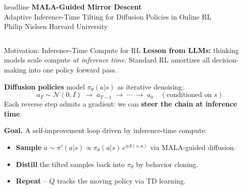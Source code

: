 \documentclass[final,hyperref={pdfpagelabels=false}]{beamer}
\newlength{\colwidth}
\begin{document}
\begin{frame}[t]

\begin{beamercolorbox}[wd=\paperwidth,ht=10cm]{headline}
\vspace{0.8cm}
\centering
{\fontsize{72}{80}\selectfont\bfseries MALA-Guided Mirror Descent}\\[0.6cm]
{\fontsize{38}{46}\selectfont Adaptive Inference-Time Tilting for Diffusion Policies in Online RL}\\[0.8cm]
{\fontsize{32}{40}\selectfont Philip Nielsen \hspace{3cm} Harvard University}\\[0.5cm]
\end{beamercolorbox}

\vspace{0.8cm}

\begin{columns}[t]

\begin{column}{\colwidth}

\begin{block}{\Large Motivation: Inference-Time Compute for RL}
\textbf{Lesson from LLMs:} thinking models scale compute \emph{at inference time}.
Standard RL amortizes all decision-making into one policy forward pass.

\vspace{0.4em}
\textbf{Diffusion policies} model $\pi_\theta(a|s)$ as iterative denoising:
\[
a_T \sim \mathcal{N}(0, I) \;\to\; a_{T-1} \;\to\; \cdots \;\to\; a_0 \quad (\text{conditioned on } s)
\]
Each reverse step admits a gradient: we can \textbf{steer the chain at inference time}.

\vspace{0.4em}
\textbf{Goal.} A self-improvement loop driven by inference-time compute:
\begin{itemize}
  \item \textcolor{harvardcrimson}{\textbf{Sample}} $a\sim\pi'(a|s)\propto\pi_\theta(a|s)\,e^{\eta A(s,a)}$ via MALA-guided diffusion.
  \item \textcolor{softgreen}{\textbf{Distill}} the tilted samples back into $\pi_\theta$ by behavior cloning.
  \item \textcolor{harvardcrimson}{\textbf{Repeat}} -- $Q$ tracks the moving policy via TD learning.
\end{itemize}
\end{block}


\end{column}
\end{columns}
\end{frame}
\end{document}
